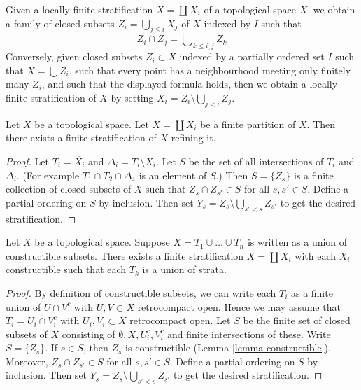 \begin{remark}
\label{remark-locally-finite-stratification}
Given a locally finite stratification $X = \coprod X_i$ of a
topological space $X$, we obtain a family of closed subsets
$Z_i = \bigcup_{j \leq i} X_j$ of $X$ indexed by $I$ such that
$$
Z_i \cap Z_j = \bigcup\nolimits_{k \leq i, j} Z_k
$$
Conversely, given closed subsets $Z_i \subset X$ indexed by a
partially ordered set $I$ such that $X = \bigcup Z_i$, such that every point
has a neighbourhood meeting only finitely many $Z_i$, and such that
the displayed formula holds, then we obtain a locally finite
stratification of $X$ by setting $X_i = Z_i \setminus \bigcup_{j < i} Z_j$.
\end{remark}

\begin{lemma}
\label{lemma-partition-refined-by-stratification}
Let $X$ be a topological space. Let $X = \coprod X_i$ be a finite partition
of $X$. Then there exists a finite stratification of $X$ refining it.
\end{lemma}

\begin{proof}
Let $T_i = \overline{X_i}$ and $\Delta_i = T_i \setminus X_i$.
Let $S$ be the set of all intersections of $T_i$ and $\Delta_i$.
(For example $T_1 \cap T_2 \cap \Delta_4$ is an element of $S$.)
Then $S = \{Z_s\}$ is a finite collection of closed subsets of $X$ such that
$Z_s \cap Z_{s'} \in S$ for all $s, s' \in S$. Define a partial ordering
on $S$ by inclusion. Then set $Y_s = Z_s \setminus \bigcup_{s' < s} Z_{s'}$
to get the desired stratification.
\end{proof}

\begin{lemma}
\label{lemma-constructible-partition-refined-by-stratification}
Let $X$ be a topological space. Suppose $X = T_1 \cup \ldots \cup T_n$
is written as a union of constructible subsets. There exists a finite
stratification $X = \coprod X_i$ with each $X_i$ constructible
such that each $T_k$ is a union of strata.
\end{lemma}

\begin{proof}
By definition of constructible subsets, we can write each $T_i$ as a
finite union of $U \cap V^c$ with $U, V \subset X$ retrocompact open.
Hence we may assume that $T_i = U_i \cap V_i^c$
with $U_i, V_i \subset X$ retrocompact open. Let $S$ be the
finite set of closed subsets of $X$ consisting of
$\emptyset, X, U_i^c, V_i^c$ and finite intersections of these.
Write $S = \{Z_s\}$. If $s \in S$, then $Z_s$ is constructible
(Lemma \ref{lemma-constructible}).
Moreover, $Z_s \cap Z_{s'} \in S$ for all $s, s' \in S$.
Define a partial ordering on $S$ by inclusion. Then set
$Y_s = Z_s \setminus \bigcup_{s' < s} Z_{s'}$
to get the desired stratification.
\end{proof}

